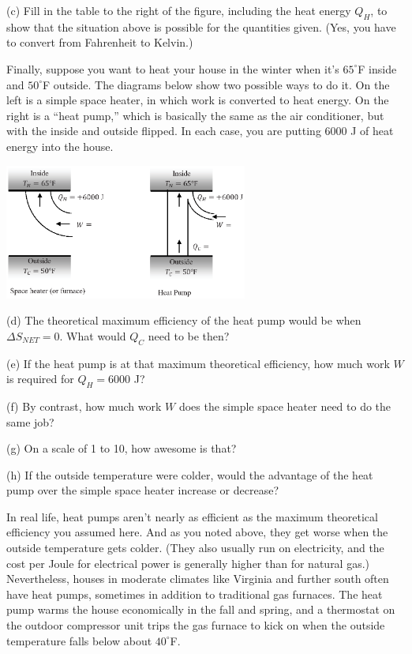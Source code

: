 (c) Fill in the table to the right of the figure, including the heat energy $Q_H$, to show that the situation above is possible for the quantities given.  (Yes, you have to convert from Fahrenheit to Kelvin.)
\answerspace{0.2 in}

\pagebreak[2]
Finally, suppose you want to heat your house in the winter when it's $65^\circ$F inside and $50^\circ$F outside.  The diagrams below show two possible ways to do it.  On the left is a simple space heater, in which work is converted to heat energy.  On the right is a ``heat pump,'' which is basically the same as the air conditioner, but with the inside and outside flipped.  In each case, you are putting 6000 J of heat energy into the house.

\begin{center}
\vspace{-0.2 in}
\includegraphics[width=0.6\textwidth]{entropy_is_it_possible/fig7.eps}
\vspace{-0.1 in}
\end{center}

(d) The theoretical maximum efficiency of the heat pump would be when $\Delta S_{NET}=0$.  What would $Q_C$ need to be then?
\answerspace{1.2 in}

(e) If the heat pump is at that maximum theoretical efficiency, how much work $W$ is required for $Q_H = 6000$ J?
 \answerspace{0.6 in}

(f) By contrast, how much work $W$ does the simple space heater need to do the same job? 
\answerspace{0.4 in}

(g) On a scale of 1 to 10, how awesome is that?
\answerspace{0.4 in}

(h) If the outside temperature were colder, would the advantage of the heat pump over the simple space heater increase or decrease? 
\answerspace{0.4 in}

In real life, heat pumps aren't nearly as efficient as the maximum theoretical efficiency you assumed here.  And as you noted above, they get worse when the outside temperature gets colder.  (They also usually run on electricity, and the cost per Joule for electrical power is generally higher than for natural gas.)  Nevertheless, houses in moderate climates like Virginia and further south often have heat pumps, sometimes in addition to traditional gas furnaces.  The heat pump warms the house economically in the fall and spring, and a thermostat on the outdoor compressor unit trips the gas furnace to kick on when the outside temperature falls below about $40^\circ$F.

